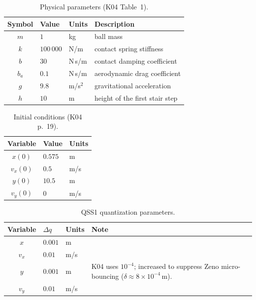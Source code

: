 \begin{table}[h!]
\centering
\caption{Physical parameters (K04 Table~1).}
\label{tab:k04-params}
\begin{tabular}{clll}
\toprule
Symbol & Value & Units & Description \\
\midrule
$m$   & $1$        & kg           & ball mass \\
$k$   & $100\,000$ & N/m          & contact spring stiffness \\
$b$   & $30$       & N\,s/m       & contact damping coefficient \\
$b_a$ & $0.1$      & N\,s/m       & aerodynamic drag coefficient \\
$g$   & $9.8$      & m/s$^2$      & gravitational acceleration \\
$h$   & $10$       & m            & height of the first stair step \\
\bottomrule
\end{tabular}
\end{table}

\begin{table}[h!]
\centering
\caption{Initial conditions (K04 p.~19).}
\label{tab:k04-ic}
\begin{tabular}{cll}
\toprule
Variable & Value & Units \\
\midrule
$x(0)$   & $0.575$ & m     \\
$v_x(0)$ & $0.5$   & m/s   \\
$y(0)$   & $10.5$  & m     \\
$v_y(0)$ & $0$     & m/s   \\
\bottomrule
\end{tabular}
\end{table}

\begin{table}[h!]
\centering
\caption{QSS1 quantization parameters.}
\label{tab:k04-quant}
\begin{tabular}{cllp{6.5cm}}
\toprule
Variable & $\Delta q$ & Units & Note \\
\midrule
$x$   & $0.001$ & m   & \\
$v_x$ & $0.01$  & m/s & \\
$y$   & $0.001$ & m   & K04 uses $10^{-4}$; increased to suppress Zeno
                         micro-bouncing ($\delta \approx 8\times10^{-4}$\,m). \\
$v_y$ & $0.01$  & m/s & \\
\bottomrule
\end{tabular}
\end{table}

